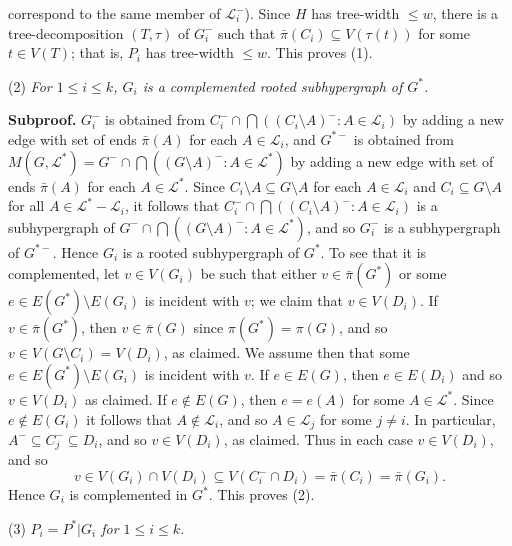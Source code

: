 \noindent correspond to the same member of $\mathscr{L}_i^-$). Since $H$ has tree-width $\le w$, there is a tree-decomposition $(T, \tau)$ of $G_i^-$ such that $\bar{\pi}(C_i) \subseteq V(\tau(t))$ for some $t \in V(T)$; that is, $P_i$ has tree-width $\le w$. This proves (1).

\hspace*{12pt}(2) \textit{For $1 \le i \le k$, $G_i$ is a complemented rooted subhypergraph of $G^*$.}

\textbf{Subproof.} $G_i^-$ is obtained from $C_i^- \cap \bigcap ((C_i \setminus A)^- \colon A \in \mathscr{L}_i)$ by adding a new edge with set of ends $\bar{\pi}(A)$ for each $A \in \mathscr{L}_i$, and $G^{*-}$ is obtained from $M(G, \mathscr{L}^*) = G^- \cap \bigcap ((G \setminus A)^- \colon A \in \mathscr{L}^*)$ by adding a new edge with set of ends $\bar{\pi}(A)$ for each $A \in \mathscr{L}^*$. Since $C_i \setminus A \subseteq G \setminus A$ for each $A \in \mathscr{L}_i$ and $C_i \subseteq G \setminus A$ for all $A \in \mathscr{L}^* - \mathscr{L}_i$, it follows that $C_i^- \cap \bigcap ((C_i \setminus A)^- \colon A \in \mathscr{L}_i)$ is a subhypergraph of $G^- \cap \bigcap ((G \setminus A)^- \colon A \in \mathscr{L}^*)$, and so $G_i^-$ is a subhypergraph of $G^{*-}$. Hence $G_i$ is a rooted subhypergraph of $G^*$. To see that it is complemented, let $v \in V(G_i)$ be such that either $v \in \bar{\pi}(G^*)$ or some $e \in E(G^*) \setminus E(G_i)$ is incident with $v$; we claim that $v \in V(D_i)$. If $v \in \bar{\pi}(G^*)$, then $v \in \bar{\pi}(G)$ since $\pi(G^*) = \pi(G)$, and so $v \in V(G \setminus C_i) = V(D_i)$, as claimed. We assume then that some $e \in E(G^*) \setminus E(G_i)$ is incident with $v$. If $e \in E(G)$, then $e \in E(D_i)$ and so $v \in V(D_i)$ as claimed. If $e \notin E(G)$, then $e = e(A)$ for some $A \in \mathscr{L}^*$. Since $e \notin E(G_i)$ it follows that $A \notin \mathscr{L}_i$, and so $A \in \mathscr{L}_j$ for some $j \ne i$. In particular, $A^- \subseteq C_j^- \subseteq D_i$, and so $v \in V(D_i)$, as claimed. Thus in each case $v \in V(D_i)$, and so
\begin{equation*}
v \in V(G_i) \cap V(D_i) \subseteq V(C_i^- \cap D_i) = \bar{\pi}(C_i) = \bar{\pi}(G_i).
\end{equation*}
Hence $G_i$ is complemented in $G^*$. This proves (2).

\hspace*{12pt}(3) \textit{$P_i = P^* | G_i$ for $1 \le i \le k$.}

